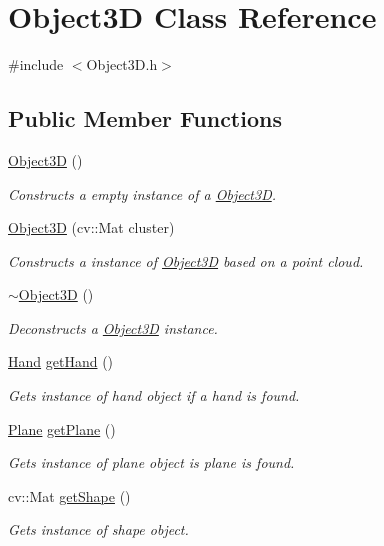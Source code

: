 \hypertarget{class_object3_d}{}\section{Object3D Class Reference}
\label{class_object3_d}


{\ttfamily \#include $<$Object3\+D.\+h$>$}

\subsection*{Public Member Functions}
\begin{DoxyCompactItemize}
\item 
\hyperlink{class_object3_d_ae3a1b17fb43ab59f5cf7b0ee21b9120b}{Object3D} ()
\begin{DoxyCompactList}\small\item\em Constructs a empty instance of a \hyperlink{class_object3_d}{Object3D}. \end{DoxyCompactList}\item 
\hyperlink{class_object3_d_a7ed04ee42be0d19ad0a446375fd7ade4}{Object3D} (cv\+::\+Mat cluster)
\begin{DoxyCompactList}\small\item\em Constructs a instance of \hyperlink{class_object3_d}{Object3D} based on a point cloud. \end{DoxyCompactList}\item 
\hyperlink{class_object3_d_a73b016a1aa7eb3be3c49671f3054565d}{$\sim$\+Object3D} ()
\begin{DoxyCompactList}\small\item\em Deconstructs a \hyperlink{class_object3_d}{Object3D} instance. \end{DoxyCompactList}\item 
\hyperlink{class_hand}{Hand} \hyperlink{class_object3_d_a5748cef4a356823798c98446fe071f28}{get\+Hand} ()
\begin{DoxyCompactList}\small\item\em Gets instance of hand object if a hand is found. \end{DoxyCompactList}\item 
\hyperlink{class_plane}{Plane} \hyperlink{class_object3_d_a25fb10b8403446f7b8a0cb76a1ec97a2}{get\+Plane} ()
\begin{DoxyCompactList}\small\item\em Gets instance of plane object is plane is found. \end{DoxyCompactList}\item 
cv\+::\+Mat \hyperlink{class_object3_d_a234a43ffebe47852173649465476e2ec}{get\+Shape} ()
\begin{DoxyCompactList}\small\item\em Gets instance of shape object. \end{DoxyCompactList}\end{DoxyCompactItemize}
